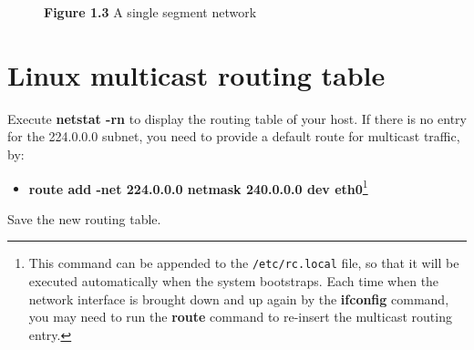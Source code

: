 \documentclass{../UTNetLab}
\begin{document}
    \begin{minipage}{0.48\textwidth}
        \begin{flushright}
            \begin{figure}[H]
                \centering
                \caption{\textbf{Figure 1.3} A single segment network}
                \label{fig:fig13}
            \end{figure}
        \end{flushright}
    \end{minipage}

\section{Linux multicast routing table}
\label{sec:linux-multicast-routing}
    Execute \textbf{netstat -rn} to display the routing table of your host.
    If there is no entry for the 224.0.0.0 subnet, you need to provide a default route for multicast traffic, by:
    \begin{itemize}
        \item [] \textbf{route add -net 224.0.0.0 netmask 240.0.0.0 dev eth0}\footnote{This command can be appended to the \texttt{/etc/rc.local} file, so that it will be executed automatically when the system bootstraps. Each time when the network interface is brought down and up again by the \textbf{ifconfig} command, you may need to run the \textbf{route} command to re-insert the multicast routing entry.}
    \end{itemize}
    Save the new routing table.
\end{document}
